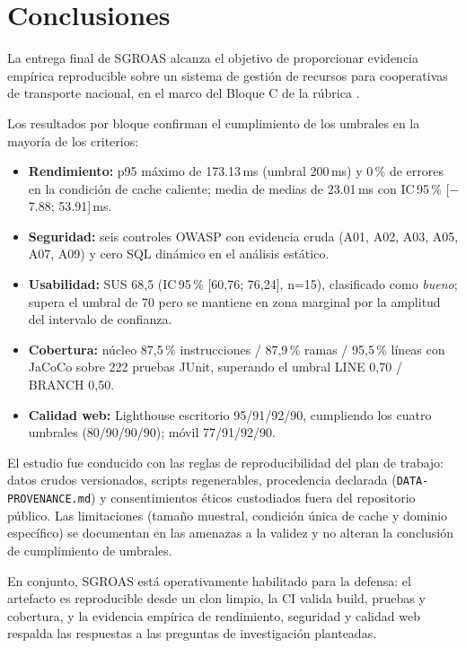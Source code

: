 \chapter{Conclusiones}
\label{cap:conclusiones}

La entrega final de SGROAS alcanza el objetivo de proporcionar evidencia empírica
reproducible sobre un sistema de gestión de recursos para cooperativas de
transporte nacional, en el marco del Bloque C de la rúbrica \cite{uteq2026guia}.

Los resultados por bloque confirman el cumplimiento de los umbrales en la mayoría
de los criterios:
\begin{itemize}
  \item \textbf{Rendimiento:} p95 máximo de 173.13\,ms (umbral 200\,ms) y 0\,\% de
        errores en la condición de cache caliente; media de medias de 23.01\,ms
        con IC\,95\,\% [$-$7.88; 53.91]\,ms.
  \item \textbf{Seguridad:} seis controles OWASP con evidencia cruda (A01, A02,
        A03, A05, A07, A09) y cero SQL dinámico en el análisis estático.
  \item \textbf{Usabilidad:} SUS 68,5 (IC\,95\,\% [60,76; 76,24], n=15), clasificado como
        \emph{bueno}; supera el umbral de 70 pero se mantiene en zona marginal por la
        amplitud del intervalo de confianza.
  \item \textbf{Cobertura:} núcleo 87,5\,\% instrucciones / 87,9\,\% ramas / 95,5\,\% líneas con JaCoCo sobre 222 pruebas JUnit, superando el umbral LINE 0,70 / BRANCH 0,50.
  \item \textbf{Calidad web:} Lighthouse escritorio 95/91/92/90, cumpliendo los cuatro
        umbrales (80/90/90/90); móvil 77/91/92/90.
\end{itemize}

El estudio fue conducido con las reglas de reproducibilidad del plan de trabajo:
datos crudos versionados, scripts regenerables, procedencia declarada
(\texttt{DATA-PROVENANCE.md}) y consentimientos éticos custodiados fuera del
repositorio público. Las limitaciones (tamaño muestral, condición única de cache y
dominio específico) se documentan en las amenazas a la validez y no alteran la
conclusión de cumplimiento de umbrales.

En conjunto, SGROAS está operativamente habilitado para la defensa: el artefacto
es reproducible desde un clon limpio, la CI valida build, pruebas y cobertura, y la
evidencia empírica de rendimiento, seguridad y calidad web respalda las respuestas
a las preguntas de investigación planteadas.